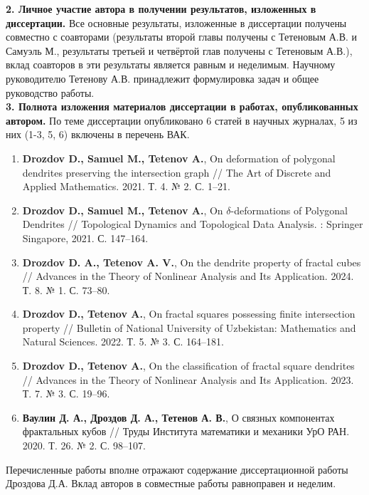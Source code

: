 \documentclass[14pt, a4paper]{extarticle}
\begin{document}
\quad

{\bf 2. Личное участие автора в получении результатов, изложенных в диссертации.}
Все основные результаты, изложенные в диссертации получены совместно с соавторами (результаты второй главы получены с Тетеновым А.В. и Самуэль М., результаты третьей и четвёртой глав получены с Тетеновым А.В.), вклад соавторов в эти результаты является равным и неделимым.
Научному руководителю Тетенову А.В. принадлежит формулировка задач и общее руководство работы.\\

{\bf 3. Полнота изложения материалов диссертации в работах, опубликованных автором.}
По теме диссертации опубликовано 6 статей в научных журналах, 5 из них (1-3, 5, 6) включены в перечень ВАК.\\

\begin{enumerate}[nolistsep]
\item {\bf Drozdov D., Samuel M., Tetenov A.}, On deformation of polygonal dendrites preserving the intersection graph // The Art of Discrete and Applied Mathematics. 2021. Т. 4. № 2. С. 1--21.
\item {\bf Drozdov D., Samuel M., Tetenov A.}, On $\delta$-deformations of Polygonal Dendrites // Topological Dynamics and Topological Data Analysis. : Springer Singapore, 2021. С. 147--164.
\item
{\bf Drozdov D. A., Tetenov A. V.}, On the dendrite property of fractal cubes // Advances in the Theory of Nonlinear Analysis and Its Application. 2024. Т. 8. № 1. С. 73--80.
\item {\bf Drozdov D., Tetenov A.}, On fractal squares possessing finite intersection property // Bulletin of National University of Uzbekistan: Mathematics and Natural Sciences. 2022. Т. 5. № 3. С. 164--181.
\item {\bf Drozdov D., Tetenov A.}, On the classification of fractal square dendrites // Advances in the Theory of Nonlinear Analysis and Its Application. 2023. Т. 7. № 3. С. 19--96.
\item {\bf Ваулин Д. А., Дроздов Д. А., Тетенов А. В.}, О связных компонентах фрактальных кубов // Труды Института математики и механики УрО РАН. 2020. Т. 26. № 2. С. 98--107.
\end{enumerate}

Перечисленные работы вполне отражают содержание диссертационной работы Дроздова Д.А. 
Вклад авторов в совместные работы равноправен и неделим.\\
\end{document}
